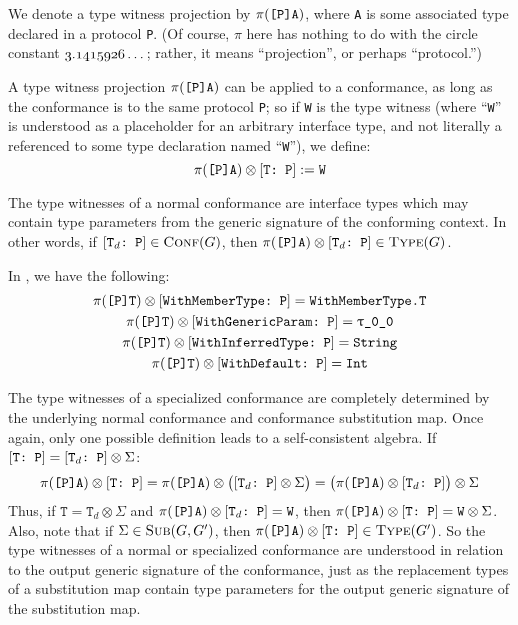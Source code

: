 \documentclass[../generics]{subfiles}
\begin{document}
We denote a type witness projection by $\pi(\texttt{[P]A})$, where \texttt{A} is some associated type declared in a protocol \texttt{P}. (Of course, $\pi$ here has nothing to do with the circle constant $\oldstylenums{3.1415926}\ldots\,$; rather, it means ``projection'', or perhaps ``protocol.'')

A type witness projection $\pi(\texttt{[P]A})$ can be applied to a conformance, as long as the conformance is to the same protocol \texttt{P}; so if \texttt{W} is the type witness (where ``\texttt{W}'' is understood as a placeholder for an arbitrary interface type, and not literally a referenced to some type declaration named ``\texttt{W}''), we define:
\[\pi(\texttt{[P]A})\otimes[\texttt{T:~P}]:=\texttt{W}\]

The type witnesses of a normal conformance are interface types which may contain type parameters from the generic signature of the conforming context. In other words, if $[\texttt{$\texttt{T}_d$:~P}]\in\textsc{Conf}({G})$, then $\pi(\texttt{[P]A})\otimes[\texttt{$\texttt{T}_d$:~P}]\in\textsc{Type}({G})$.

In , we have the following:
\begin{gather*}
\AssocType{[P]T}\otimes\ConfReq{WithMemberType}{P}=\texttt{WithMemberType.T}\\
\AssocType{[P]T}\otimes\ConfReq{WithGenericParam}{P}=\ttgp{0}{0}\\
\AssocType{[P]T}\otimes\ConfReq{WithInferredType}{P}=\texttt{String}\\
\AssocType{[P]T}\otimes\ConfReq{WithDefault}{P}=\texttt{Int}
\end{gather*}

The type witnesses of a specialized conformance are completely determined by the underlying normal conformance and conformance substitution map. Once again, only one possible definition leads to a self-consistent algebra. If $[\texttt{T:~P}] = [\texttt{$\texttt{T}_d$:~P}]\otimes\Sigma$:
\[
\pi(\texttt{[P]A}) \otimes [\texttt{T:~P}] = \pi(\texttt{[P]A}) \otimes \bigl([\texttt{$\texttt{T}_d$:~P}]\otimes\Sigma\bigr) = \bigl(\pi(\texttt{[P]A}) \otimes[\texttt{$\texttt{T}_d$:~P}]\bigr)\otimes\Sigma
\]
Thus, if $\texttt{T}=\texttt{T}_d\otimes\Sigma$ and $\pi(\texttt{[P]A})\otimes[\texttt{$\texttt{T}_d$:~P}]=\texttt{W}$, then $\pi(\texttt{[P]A})\otimes[\texttt{T:~P}]=\texttt{W}\otimes\Sigma$. Also, note that if $\Sigma\in\textsc{Sub}({G, G^\prime})$, then $\pi(\texttt{[P]A}) \otimes [\texttt{T:~P}]\in\textsc{Type}({G^\prime})$. So the type witnesses of a normal or specialized conformance are understood in relation to the output generic signature of the conformance, just as the replacement types of a substitution map contain type parameters for the output generic signature of the substitution map.
\end{document}
